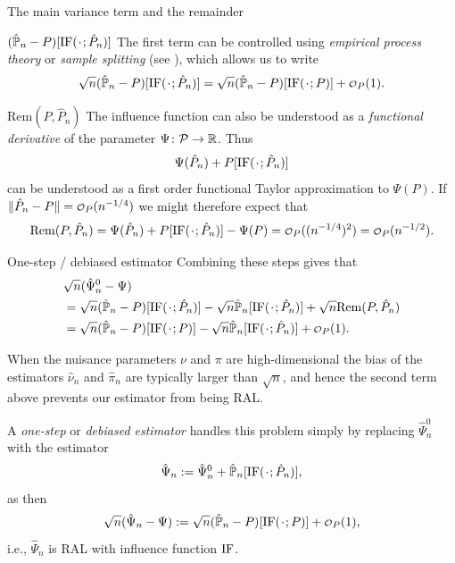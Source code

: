 \documentclass[smaller]{beamer}\usepackage{listings}
\begin{document}
\begin{frame}[label={sec:org6a22f23}]{The main variance term and the remainder}
\small
\begin{block}{\((\empmeas-P)[\ic(\blank; \hat{P}_n)]\)}
The first term can be controlled using \emph{empirical process theory} or \emph{sample splitting} (see
\cite{kennedy2022semiparametric}), which allows us to write \[ \sqrt{n}(\empmeas-P)[\ic(\blank;
\hat P_n)] = \sqrt{n}(\empmeas-P)[\ic(\blank; P)] + \smallO_P(1).\]
\end{block}

\begin{block}{\(\mathrm{Rem}(P, \hat{P}_n)\)}
The influence function can also be understood as a \emph{functional derivative} of the parameter
\(\Psi\colon \mathcal{P} \rightarrow \mathbb{R}\). Thus \[\Psi(\hat P_n) + P[\ic(\blank; \hat{P}_n)]\] can be
understood as a first order functional Taylor approximation to \(\Psi(P)\). If \(\| \hat{P}_n -P \| =
\smallO_P(n^{-1/4})\) we might therefore expect that \[ \mathrm{Rem}(P, \hat{P}_n) = \Psi(\hat P_n) +
P[\ic(\blank; \hat{P}_n)] - \Psi(P) = \smallO_P((n^{-1/4})^2) = \smallO_P(n^{-1/2}). \]
\end{block}
\end{frame}

\begin{frame}[label={sec:orgc7cb200}]{One-step / debiased estimator}
\small
Combining these steps gives that
\begin{align*}
  & \sqrt{n}(\hat{\Psi}_n^0 - \Psi) 
  \\
    &  = \sqrt{n}(\empmeas-P)[\ic(\blank; \hat{P}_n)]
    - \sqrt{n}\empmeas[\ic(\blank; \hat{P}_n)]
    + \sqrt{n}\mathrm{Rem}(P,  \hat{P}_n)
    \\
    & =
    \sqrt{n}(\empmeas-P)[\ic(\blank; P)]
    - \sqrt{n}\empmeas[\ic(\blank; \hat{P}_n)]
    + \smallO_P(1).
\end{align*}

When the nuisance parameters \(\nu\) and \(\pi\) are high-dimensional the bias of the estimators
\(\hat{\nu}_n\) and \(\hat{\pi}_n\) are typically larger than \(\sqrt{n}\), and hence the second term
above prevents our estimator from being RAL.

\vfill

A \emph{one-step} or \emph{debiased estimator} handles this problem simply by replacing \(\hat\Psi_n^0\) with
the estimator \[\hat\Psi_n:= \hat\Psi_n^0 + \empmeas[\ic(\blank; \hat{P}_n)],\] as then \[\sqrt n
(\hat\Psi_n - \Psi):= \sqrt{n}(\empmeas-P)[\ic(\blank; P)] + \smallO_P(1),\] i.e., \(\hat\Psi_n\) is
RAL with influence function \(\mathrm{IF}\).
\end{frame}
\end{document}
